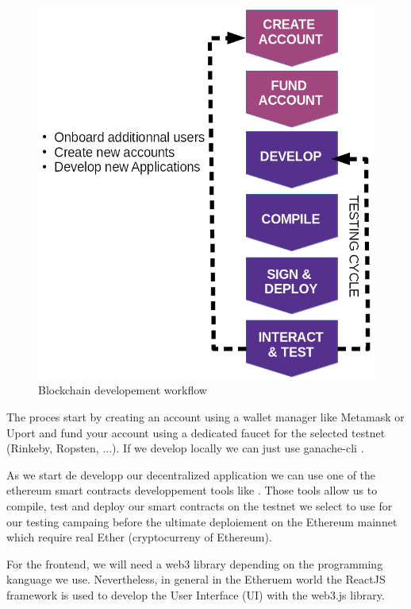 \documentclass{isprs} %
\begin{document}
\begin{figure}[ht!]
\begin{center}
		\includegraphics[width=1.0\columnwidth]{figures/eth-dev-process.png}
	\caption{Blockchain developement workflow}
\label{fig:figure_dev_workflow}
\end{center}
\end{figure}
  
The proces start by creating an account using a wallet manager like Metamask \cite{metamask} or Uport \cite{uport} and fund your account using a dedicated faucet for the selected testnet (Rinkeby, Ropsten, ...). If we develop locally we can just use ganache-cli \cite{truffle}.

As we start de developp our decentralized application we can use one of the ethereum smart contracts developpement tools like \cite{truffle}. Those tools allow us to compile, test and deploy our smart contracts on the testnet we select to use for our testing campaing before the ultimate deploiement on the Ethereum mainnet which require real Ether (cryptocurreny of Ethereum).

For the frontend, we will need a web3 library depending on the programming kanguage we use. Nevertheless, in general in the Etheruem world the ReactJS \cite{reactjs} framework is used to develop the User Interface (UI) with the web3.js \cite{web3_js} library.
\end{document}
